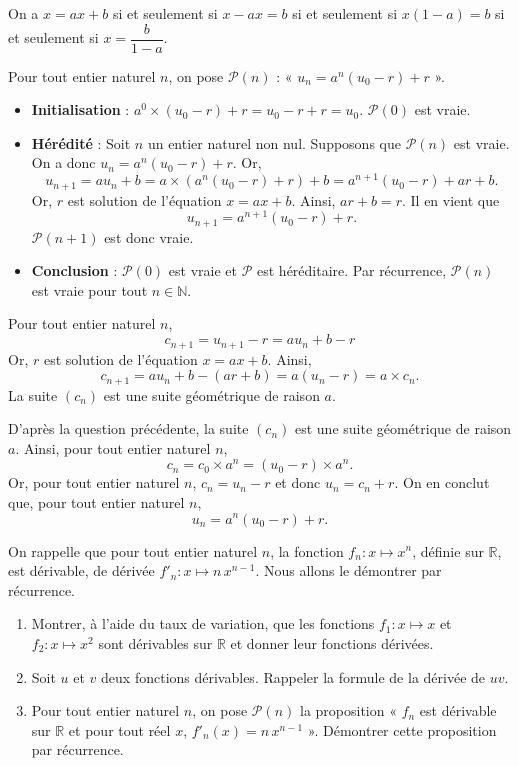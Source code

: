 \documentclass[11pt,fleqn]{book} %
\begin{document}
\begin{solution}On a \(x=ax+b\) si et seulement si \(x-ax=b\) si et seulement si \(x(1-a)=b\) si et seulement si \(x=\dfrac{b}{1-a}\).

Pour tout entier naturel \(n\), on pose \(\mathcal{P}(n)\) : « \(u_n=a^n(u_0-r)+r\) ».
\begin{itemize} \item \textbf{Initialisation} : \(a^0 \times (u_0-r)+r = u_0-r+r=u_0\). \( \mathcal{P}(0) \) est vraie.
\item \textbf{Hérédité} : Soit \(n\) un entier naturel non nul. Supposons que \( \mathcal{P}(n)\) est vraie. On a donc \(u_n=a^n(u_0-r)+r\). Or,
\[u_{n+1}= au_n+b=a \times (a^n(u_0-r)+r) + b = a^{n+1} (u_0-r)+ar+b.\]
Or, \(r\) est solution de l'équation \(x =ax+b\). Ainsi, \(ar+b=r\). Il en vient que
\[u_{n+1}=a^{n+1} (u_0-r)+r.\]
\( \mathcal{P}(n+1)\) est donc vraie.
\item \textbf{Conclusion} : \(\mathcal{P}(0)\) est vraie et \(\mathcal{P}\) est héréditaire. Par récurrence, \(\mathcal{P}(n)\) est vraie pour tout \(n\in\mathbb{N}\).\end{itemize}

Pour tout entier naturel \(n\),
\[c_{n+1}=u_{n+1}-r=au_n+b-r\]
Or, \(r\) est solution de l'équation \(x=ax+b\). Ainsi,
\[c_{n+1}=au_n+b-(ar+b) =a(u_n-r)=a\times c_n.\]
La suite \((c_n)\) est une suite géométrique de raison \(a\).

D'après la question précédente, la suite \((c_n)\) est une suite géométrique de raison \(a\). Ainsi, pour tout entier naturel \(n\),
\[c_n=c_0 \times a^n = (u_0-r) \times a^n.\]
Or, pour tout entier naturel \(n\), \(c_n=u_n-r\) et donc \(u_n=c_n+r\). On en conclut que, pour tout entier naturel \(n\),
\[u_n=a^n(u_0-r)+r.\]\end{solution}


\begin{exercise}
On rappelle que pour tout entier naturel $n$, la fonction $f_n : x \mapsto x^n$, définie sur $\mathbb{R}$, est dérivable, de dérivée $f'_n : x \mapsto n\,x^{n-1}$. Nous allons le démontrer par récurrence.
\begin{enumerate}
\item Montrer, à l'aide du taux de variation, que les fonctions \(f_1 : x \mapsto x\) et \(f_2 : x \mapsto x^2\) sont dérivables sur \( \mathbb{R}\) et donner leur fonctions dérivées.
\item Soit $u$ et $v$ deux fonctions dérivables. Rappeler la formule de la dérivée de $uv$.
\item Pour tout entier naturel $n$, on pose $\mathcal{P}(n)$ la proposition « $f_n$ est dérivable sur $\mathbb{R}$ et pour tout réel $x$, $f'_n(x)=n\,x^{n-1}$ ». Démontrer cette proposition par récurrence.\end{enumerate}
\end{exercise}
\end{document}
